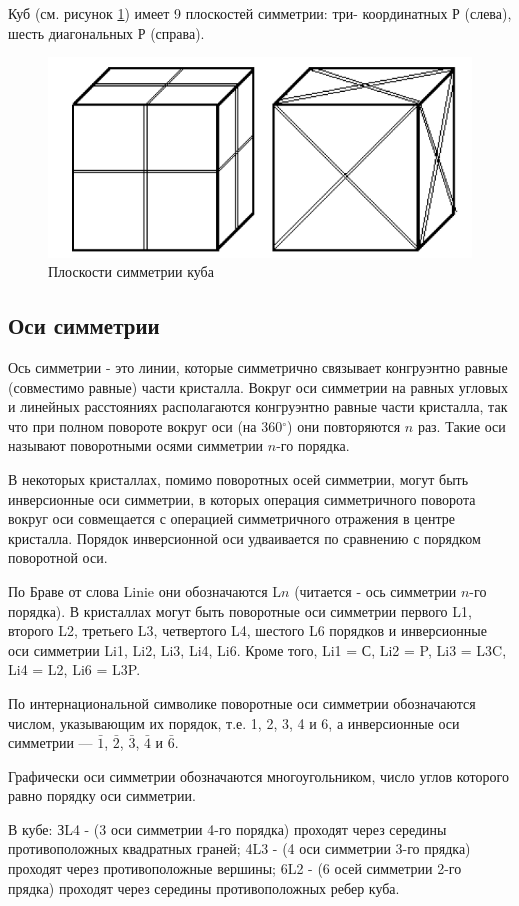 \documentclass[a4paper, 12pt]{article}
\begin{document}
Куб (см. рисунок \ref{fig:cube}) имеет 9 плоскостей симметрии: три- координатных Р (слева), шесть диагональных Р (справа).

\begin{figure}[H]
	\centering
	\includegraphics[width=0.5\linewidth]{Cube}
	\caption{Плоскости симметрии куба}
	\label{fig:cube}
\end{figure}

\subsection{Оси симметрии}

Ось симметрии - это линии, которые симметрично связывает конгруэнтно равные (совместимо равные) части кристалла.
Вокруг оси симметрии на равных угловых и линейных расстояниях располагаются конгруэнтно равные части кристалла, так что при полном повороте вокруг оси (на 360$^\circ$) они повторяются $n$ раз. Такие оси называют поворотными осями симметрии $n$-го порядка.

В некоторых кристаллах, помимо поворотных осей симметрии, могут быть инверсионные оси симметрии, в которых операция симметричного поворота вокруг оси совмещается с операцией симметричного отражения в центре кристалла. Порядок инверсионной оси удваивается по сравнению с порядком поворотной оси.

По Браве от слова Linie они обозначаются L$n$ (читается - ось симметрии $n$-го порядка). В кристаллах могут быть поворотные оси симметрии первого L1, второго L2, третьего L3, четвертого L4, шестого L6 порядков и инверсионные оси симметрии Li1, Li2, Li3, Li4, Li6. Кроме того, Li1 = С, Li2 = P, Li3 = L3C, Li4 = L2, Li6 = L3P.

По интернациональной символике поворотные оси симметрии обозначаются числом, указывающим их порядок, т.е. 1, 2, 3, 4 и 6, а инверсионные оси симметрии --- $\bar{1}$, $\bar{2}$, $\bar{3}$, $\bar{4}$ и $\bar{6}$.

Графически оси симметрии обозначаются многоугольником, число углов которого равно порядку оси симметрии.

В кубе: ЗL4 - (3 оси симметрии 4-го порядка) проходят через середины противоположных квадратных граней; 4L3 - (4 оси симметрии 3-го прядка) проходят через противоположные вершины; 6L2 - (6 осей симметрии 2-го прядка) проходят через середины противоположных ребер куба.
\end{document}
